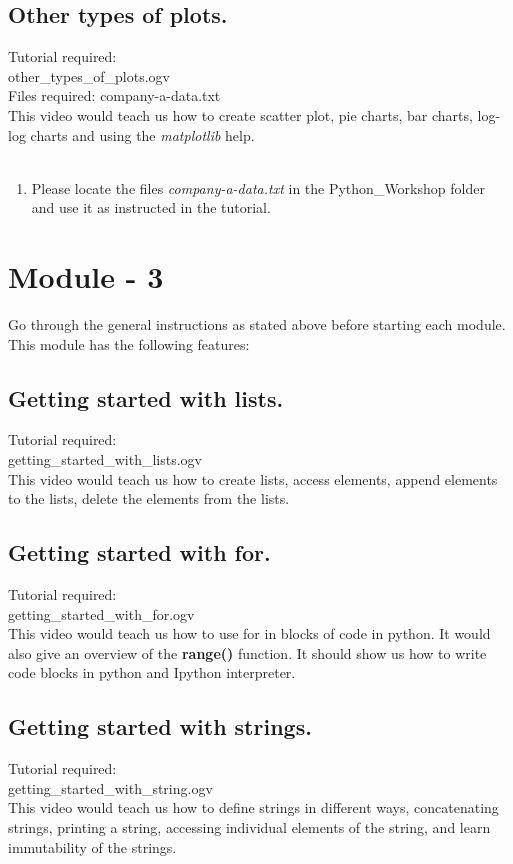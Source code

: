 \documentclass[11pt,twocolumn]{article}
\newenvironment{enumcpt}{\begin{enumerate} \topsep 0pt \partopsep 0pt 
                        \parsep 0pt
                        \itemsep 0pt \leftmargin -1in \rightmargin 0pt
                        }{\end{enumerate}}
\begin{document}
    \subsection{Other types of plots.}
    Tutorial required:\\ other\_types\_of\_plots.ogv \\
    Files required: company-a-data.txt \\
    This video would teach us how to create scatter plot, pie charts, bar charts, log-log charts and using the \emph{matplotlib} help.\\ \\
\begin{enumcpt}
\item Please locate the files \emph{company-a-data.txt} in the Python\_Workshop folder and use it
      as instructed in the tutorial. 
\end{enumcpt}
  
\section{Module - 3}
Go through the general instructions as stated above before starting each module.\\
This module has the following features:
\subsection{Getting started with lists.}
Tutorial required: \\getting\_started\_with\_lists.ogv \\
This video would teach us how to create lists, access elements, append elements to the lists, delete the elements from the lists. 
\subsection{Getting started with for.}
Tutorial required: \\getting\_started\_with\_for.ogv \\
This video would teach us how to use for in blocks of code in python. It would also give an overview of the \textbf{range()} function. It should show us how to write code blocks in python and Ipython interpreter. 
\subsection{Getting started with strings.}
Tutorial required: \\getting\_started\_with\_string.ogv \\
This video would teach us how to define strings in different ways, concatenating strings, printing a string, accessing individual elements of the string, and learn immutability of the strings. 
\end{document}
